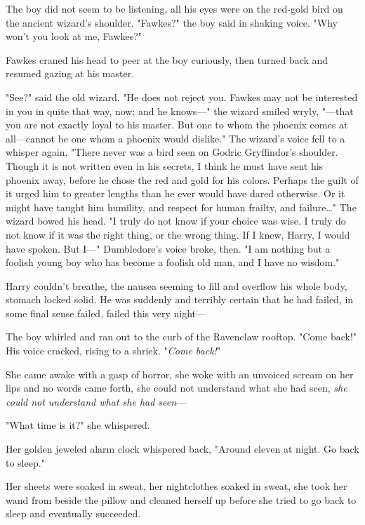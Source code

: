 The boy did not seem to be listening, all his eyes were on the red-gold bird on
the ancient wizard's shoulder. "Fawkes?" the boy said in shaking voice. "Why
won't you look at me, Fawkes?"

Fawkes craned his head to peer at the boy curiously, then turned back and
resumed gazing at his master.

"See?" said the old wizard. "He does not reject you. Fawkes may not be
interested in you in quite that way, now; and he knows---" the wizard smiled
wryly, "---that you are not exactly loyal to his master. But one to whom the
phoenix comes at all---cannot be one whom a phoenix would dislike." The
wizard's voice fell to a whisper again. "There never was a bird seen on Godric
Gryffindor's shoulder. Though it is not written even in his secrets, I think he
must have sent his phoenix away, before he chose the red and gold for his
colors. Perhaps the guilt of it urged him to greater lengths than he ever would
have dared otherwise. Or it might have taught him humility, and respect for
human frailty, and failure{\ldots}" The wizard bowed his head. "I truly do not
know if your choice was wise. I truly do not know if it was the right thing, or
the wrong thing. If I knew, Harry, I would have spoken. But I---" Dumbledore's
voice broke, then. "I am nothing but a foolish young boy who has become a
foolish old man, and I have no wisdom."

Harry couldn't breathe, the nausea seeming to fill and overflow his whole body,
stomach locked solid. He was suddenly and terribly certain that he had failed,
in some final sense failed, failed this very night---

The boy whirled and ran out to the curb of the Ravenclaw rooftop. "Come back!"
His voice cracked, rising to a shriek. "\emph{Come back!}"

She came awake with a gasp of horror, she woke with an unvoiced scream on her
lips and no words came forth, she could not understand what she had seen,
\emph{she could not understand what she had seen}---

"What time is it?" she whispered.

Her golden jeweled alarm clock whispered back, "Around eleven at night. Go back
to sleep."

Her sheets were soaked in sweat, her nightclothes soaked in sweat, she took her
wand from beside the pillow and cleaned herself up before she tried to go back
to sleep and eventually succeeded.

